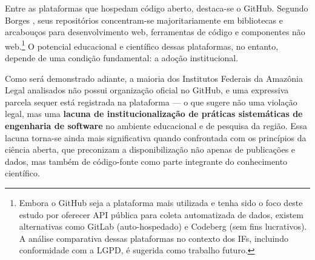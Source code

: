 \documentclass[english, spanish, brazilian]{RBIEarticle}
\begin{document}
%	
	
	Entre as plataformas que hospedam código aberto, destaca-se o GitHub. Segundo Borges \cite{borges2016}, seus repositórios concentram-se majoritariamente em bibliotecas e arcabouços para desenvolvimento web, ferramentas de código e componentes não web.\footnote{Embora o GitHub seja a plataforma mais utilizada e tenha sido o foco deste estudo por oferecer API pública para coleta automatizada de dados, existem alternativas como GitLab (auto-hospedado) e Codeberg (sem fins lucrativos). A análise comparativa dessas plataformas no contexto dos IFs, incluindo conformidade com a LGPD, é sugerida como trabalho futuro.} O potencial educacional e científico dessas plataformas, no entanto, depende de uma condição fundamental: a adoção institucional.
	
	Como será demonstrado adiante, a maioria dos Institutos Federais da Amazônia Legal analisados não possui organização oficial no GitHub, e uma expressiva parcela sequer está registrada na plataforma — o que sugere não uma violação legal, mas uma \textbf{lacuna de institucionalização de práticas sistemáticas de engenharia de software} no ambiente educacional e de pesquisa da região. Essa lacuna torna-se ainda mais significativa quando confrontada com os princípios da ciência aberta, que preconizam a disponibilização não apenas de publicações e dados, mas também de código-fonte como parte integrante do conhecimento científico.
	
\end{document}

